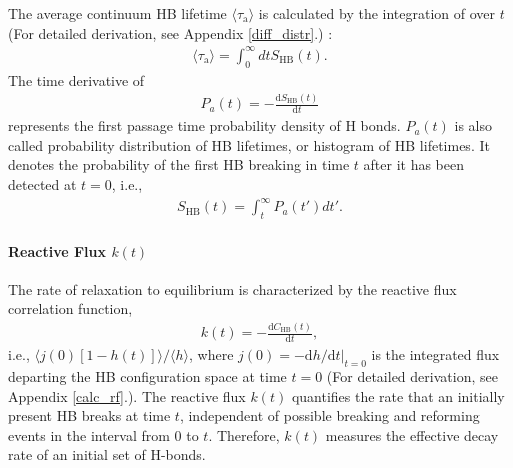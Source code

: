 The average continuum HB lifetime $\langle \tau_{\mathrm{a}} \rangle$ is calculated by the integration of \SHB over $t$ (For detailed derivation, see Appendix \ref{diff_distr}.) :  
\begin{eqnarray}
  \langle\tau_{\mathrm{a}}\rangle = \int_0^\infty dt S_{\text{HB}}(t).
\label{eq:calculate_hb_lifetime_from_s}
\end{eqnarray}
%
The time derivative of \SHB
\begin{eqnarray}
P_a(t) = -\frac{\text{d}S_{\text{HB}}(t)}{\text{d}t}
\label{eq:P_1}
\end{eqnarray}
represents the first passage time probability density of H bonds. $P_a(t)$ is also called probability distribution of HB lifetimes, \cite{Sciortino1990prl,Krausche1992,FWS99,Voloshin2009} or histogram of HB lifetimes.\cite{Geiger1984,Stanley2000}
It denotes the probability of the first HB breaking in time $t$ after it has been detected at $t=0$, i.e.,
\begin{eqnarray}
S_{\text{HB}}(t)= \int_t^\infty P_a(t')dt'.
\label{eq:P_2}
\end{eqnarray}
%

\FloatBarrier
\paragraph{Reactive Flux $k(t)$} 
The rate of relaxation to equilibrium is characterized by the reactive flux correlation function, 
\begin{eqnarray}
k(t) = -\frac{\text{d}C_{\text{HB}}(t)}{\text{d}t},
\label{eq:k}
\end{eqnarray}
i.e., $\langle j(0)[1-h(t)]\rangle/\langle h\rangle$,
where 
$j(0)=-\text{d}h/\text{d}t|_{t=0}$ 
is the integrated flux departing the HB configuration space at time $t=0$ (For detailed derivation, see Appendix \ref{calc_rf}.).
The reactive flux $k(t)$ quantifies the rate that an initially present HB breaks at time $t$, 
independent of possible breaking and reforming events in the interval from 0 to $t$.
Therefore, $k(t)$ measures the effective decay rate of an 
initial set of H-bonds. \cite{DC87,FWS00}



